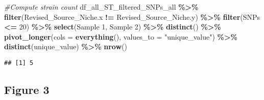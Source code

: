 \documentclass[
]{article}
\newenvironment{Shaded}{\begin{snugshade}}{\end{snugshade}}
\newcommand{\AttributeTok}[1]{\textcolor[rgb]{0.13,0.29,0.53}{#1}}
\newcommand{\CommentTok}[1]{\textcolor[rgb]{0.56,0.35,0.01}{\textit{#1}}}
\newcommand{\DecValTok}[1]{\textcolor[rgb]{0.00,0.00,0.81}{#1}}
\newcommand{\FunctionTok}[1]{\textcolor[rgb]{0.13,0.29,0.53}{\textbf{#1}}}
\newcommand{\NormalTok}[1]{#1}
\newcommand{\SpecialCharTok}[1]{\textcolor[rgb]{0.81,0.36,0.00}{\textbf{#1}}}
\newcommand{\StringTok}[1]{\textcolor[rgb]{0.31,0.60,0.02}{#1}}
\begin{document}
\begin{Shaded}
\begin{Highlighting}[]
\CommentTok{\#Compute strain count}
\NormalTok{df\_all\_ST\_filtered\_SNPs\_all }\SpecialCharTok{\%\textgreater{}\%} \FunctionTok{filter}\NormalTok{(Revised\_Source\_Niche.x }\SpecialCharTok{!=}\NormalTok{ Revised\_Source\_Niche.y) }\SpecialCharTok{\%\textgreater{}\%}
  \FunctionTok{filter}\NormalTok{(SNPs }\SpecialCharTok{\textless{}=} \DecValTok{20}\NormalTok{) }\SpecialCharTok{\%\textgreater{}\%}
  \FunctionTok{select}\NormalTok{(}\StringTok{\textasciigrave{}}\AttributeTok{Sample 1}\StringTok{\textasciigrave{}}\NormalTok{, }\StringTok{\textasciigrave{}}\AttributeTok{Sample 2}\StringTok{\textasciigrave{}}\NormalTok{) }\SpecialCharTok{\%\textgreater{}\%}
  \FunctionTok{distinct}\NormalTok{() }\SpecialCharTok{\%\textgreater{}\%}
  \FunctionTok{pivot\_longer}\NormalTok{(}\AttributeTok{cols =} \FunctionTok{everything}\NormalTok{(), }\AttributeTok{values\_to =} \StringTok{"unique\_value"}\NormalTok{) }\SpecialCharTok{\%\textgreater{}\%}
  \FunctionTok{distinct}\NormalTok{(unique\_value) }\SpecialCharTok{\%\textgreater{}\%} \FunctionTok{nrow}\NormalTok{()}
\end{Highlighting}
\end{Shaded}

\begin{verbatim}
## [1] 5
\end{verbatim}

\hypertarget{figure-3}{%
\subsection{Figure 3}\label{figure-3}}
\end{document}
